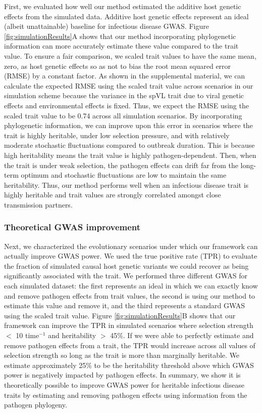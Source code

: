 \documentclass[11pt]{article}
\begin{document}
\begin{linenumbers}
First, we evaluated how well our method estimated the additive host genetic effects from the simulated data. Additive host genetic effects represent an ideal (albeit unattainable) baseline for infectious disease GWAS. Figure \ref{fig:simulationResults}A shows that our method incorporating phylogenetic information can more accurately estimate these value compared to the trait value. To ensure a fair comparison, we scaled trait values to have the same mean, zero, as host genetic effects so as not to bias the root mean squared error (RMSE) by a constant factor. As shown in the supplemental material, we can calculate the expected RMSE using the scaled trait value across scenarios in our simulation scheme because the variance in the spVL trait due to viral genetic effects and environmental effects is fixed. Thus, we expect the RMSE using the scaled trait value to be 0.74 across all simulation scenarios. By incorporating phylogenetic information, we can improve upon this error in scenarios where the trait is highly heritable, under low selection pressure, and with relatively moderate stochastic fluctuations compared to outbreak duration. This is because high heritability means the trait value is highly pathogen-dependent. Then, when the trait is under weak selection, the pathogen effects can drift far from the long-term optimum and stochastic fluctuations are low to maintain the same heritability. Thus, our method performs well when an infectious disease trait is highly heritable and trait values are strongly correlated amongst close transmission partners.

\subsubsection*{Theoretical GWAS improvement}

Next, we characterized the evolutionary scenarios under which our framework can actually improve GWAS power. We used the true positive rate (TPR) to evaluate the fraction of simulated causal host genetic variants we could recover as being significantly associated with the trait. We performed three different GWAS for each simulated dataset: the first represents an ideal in which we can exactly know and remove pathogen effects from trait values, the second is using our method to estimate this value and remove it, and the third represents a standard GWAS using the scaled trait value. Figure \ref{fig:simulationResults}B shows that our framework can improve the TPR in simulated scenarios where selection strength $<$ 10 time$^{-1}$ and heritability $>$ 45\%. If we were able to perfectly estimate and remove pathogen effects from a trait, the TPR would increase across all values of selection strength so long as the trait is more than marginally heritable. We estimate approximately 25\% to be the heritability threshold above which GWAS power is negatively impacted by pathogen effects. In summary, we show it is theoretically possible to improve GWAS power for heritable infectious disease traits by estimating and removing pathogen effects using information from the pathogen phylogeny.


\end{linenumbers}
\end{document}
